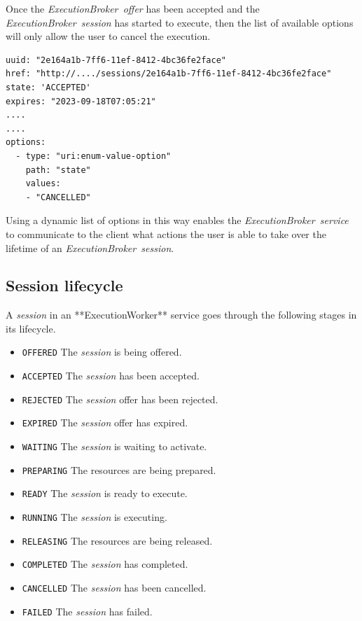 \documentclass[11pt,a4paper]{ivoa}
\newcommand{\execworkerclass} {**ExecutionWorker**}
\newcommand{\execbrokerservice}[1] {\textit{ExecutionBroker~service#1}}
\newcommand{\execoffer}[1] {\textit{ExecutionBroker~offer#1}}
\newcommand{\execsession}[1] {\textit{ExecutionBroker~session#1}}
\newcommand{\workerjob}[1] {\textit{session#1}}
\newcommand{\codeword}[1] {\texttt{#1}}
\begin{document}
Once the \execoffer{} has been accepted and the \execsession{} has started to
execute, then the list of available options will only allow the user to cancel
the execution.

\begin{lstlisting}[]
uuid: "2e164a1b-7ff6-11ef-8412-4bc36fe2face"
href: "http://..../sessions/2e164a1b-7ff6-11ef-8412-4bc36fe2face"
state: 'ACCEPTED'
expires: "2023-09-18T07:05:21"
....
....
options:
  - type: "uri:enum-value-option"
    path: "state"
    values:
    - "CANCELLED"
\end{lstlisting}

Using a dynamic list of options in this way enables the \execbrokerservice{}
to communicate to the client what actions the user is able to take
over the lifetime of an \execsession{}.

\subsection{Session lifecycle}
\label{session-lifecycle}

A \workerjob{} in an \execworkerclass{} service goes through the following stages in its lifecycle.

\begin{itemize}

    \item \codeword{OFFERED}    The \workerjob{} is being offered.
    \item \codeword{ACCEPTED}   The \workerjob{} has been accepted.
    \item \codeword{REJECTED}   The \workerjob{} offer has been rejected.
    \item \codeword{EXPIRED}    The \workerjob{} offer has expired.
    \item \codeword{WAITING}    The \workerjob{} is waiting to activate.
    \item \codeword{PREPARING}  The resources are being prepared.
    \item \codeword{READY}      The \workerjob{} is ready to execute.
    \item \codeword{RUNNING}    The \workerjob{} is executing.
    \item \codeword{RELEASING}  The resources are being released.
    \item \codeword{COMPLETED}  The \workerjob{} has completed.
    \item \codeword{CANCELLED}  The \workerjob{} has been cancelled.
    \item \codeword{FAILED}     The \workerjob{} has failed.

\end{itemize}
\end{document}
